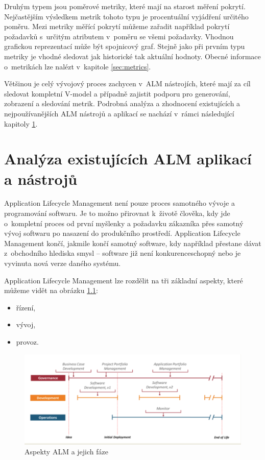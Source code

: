 \documentclass[czech,master]{diploma}
\begin{document}
Druhým typem jsou poměrové metriky, které mají na starost měření pokrytí. Nejčastějším výsledkem metrik tohoto typu je procentuální vyjádření určitého poměru. Mezi metriky měřící pokrytí můžeme zařadit například pokrytí požadavků s~určitým atributem v~poměru se všemi požadavky. Vhodnou grafickou reprezentací může být spojnicový graf. Stejně jako při prvním typu metriky je vhodné sledovat jak historické tak aktuální hodnoty. Obecné informace o~metrikách lze nalézt v~kapitole \ref{sec:metrics}.

Většinou je celý vývojový proces zachycen v~ALM nástrojích, které mají za cíl sledovat kompletní V-model a případně zajistit podporu pro generování, zobrazení a sledování metrik. Podrobná analýza a zhodnocení existujících a nejpoužívanějších ALM nástrojů a aplikací se nachází v~rámci následující kapitoly \ref{sec:alm}.


\chapter{Analýza existujících ALM aplikací a nástrojů}
\label{sec:alm}
Application Lifecycle Management není pouze proces samotného vývoje a programování softwaru. Je to možno přirovnat k~životě člověka, kdy jde o~kompletní proces od první myšlenky a požadavku zákazníka přes samotný vývoj softwaru po nasazení do produkčního prostředí. Application Lifecycle Management končí, jakmile končí samotný software, kdy například přestane dávat z~obchodního hlediska smysl -- software již není konkurenceschopný nebo je vyvinuta nová verze daného systému. \cite{alm_chappell}

Application Lifecycle Management lze rozdělit na tři základní aspekty, které můžeme vidět na obrázku \ref{fig:alm}:

\begin{itemize}
  \item řízení,
  \item vývoj,
  \item provoz.
\end{itemize}

\begin{figure}[!ht]
    \centering
    \includegraphics[width=1\textwidth]{Diplomka/Figures/alm.png}
    \caption{Aspekty ALM a jejich fáze \cite{alm_chappell}}
    \label{fig:alm}
\end{figure}
\end{document}
